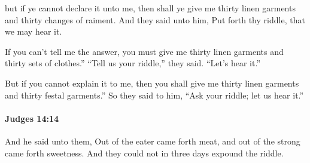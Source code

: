 			\begin{versebox}
					\item[BHS] 
					\item[ASV] but if ye cannot declare it unto me, then shall ye give me thirty linen garments and thirty changes of raiment. And they said unto him, Put forth thy riddle, that we may hear it.
					\item[NIV] If you can’t tell me the answer, you must give me thirty linen garments and thirty sets of clothes.” “Tell us your riddle,” they said. “Let’s hear it.”
					\item[NRSV] But if you cannot explain it to me, then you shall give me thirty linen garments and thirty festal garments.” So they said to him, “Ask your riddle; let us hear it.”
			\end{versebox}

		\paragraph{Judges 14:14} %
			\label{JUDGES-14-14}

			And he said unto them, Out of the eater came forth meat, and out of the strong came forth sweetness. And they could not in three days expound the riddle.

